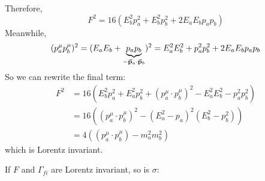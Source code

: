 \documentclass[a4paper,twoside,master.tex]{subfiles}
\begin{document}
Therefore,
\begin{equation}
    F^2 = 16(E_b^2 p_a^2 + E_b^2 p_b^2 + 2 E_a E_b p_a p_b)
\end{equation}
Meanwhile,
\begin{equation}
    (p_a^{\mu} p_b^{\mu})^2 = (E_a E_b + \underbrace{p_a p_b}_{- \va{p}_a \cdot \va{p}_b})^2 = E_a^2 E_b^2 + p_a^2 p_b^2 + 2 E_a E_b p_a p_b
\end{equation}
So we can rewrite the final term:
\begin{align}
    F^2 &= 16(E_b^2 p_a^2 + E_a^2 p_b^2 + (p_a^{\mu} \cdot p_b^{\mu})^2 - E_a^2 E_b^2 - p_a^2 p_b^2) \\
    &= 16 ( (p_a^{\mu} \cdot p_b^{\mu})^2 - (E_a^2 - p_a)^2 (E_b^2 - p_b^2) ) \\
    &= 4( (p_a^{\mu} \cdot p_b^{\mu}) - m_a^2 m_b^2)
\end{align}
which is Lorentz invariant.

If $ F $ and $ \Gamma_{f i} $ are Lorentz invariant, so is $ \sigma $:
\end{document}
